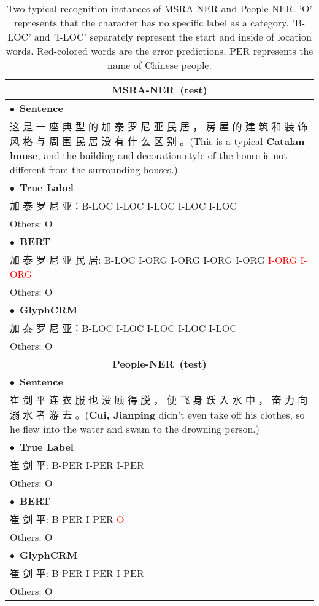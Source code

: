 \begin{CJK}{UTF8}{gbsn}
\begin{table}[t]
\renewcommand\arraystretch{1.15}
\small
\centering
\caption{Two typical recognition instances of MSRA-NER and People-NER. 'O' represents that the character has no specific label as a category. 'B-LOC' and 'I-LOC' separately represent the start and inside of location words. Red-colored words are the error predictions. PER represents the name of Chinese people.}
\label{tab:exp7}
\begin{tabular}{|p{7.5cm}|}
\hline
\multicolumn{1}{|c|}{\textbf{MSRA-NER~(test)}} \\
\hline
$\bullet$~\textbf{Sentence}\\
这 是 一 座 典 型 的 加 泰 罗 尼 亚 民 居 ， 房 屋 的 建 筑 和 装 饰 风 格 与 周 围 民 居 没 有 什 么 区 别 。(This is a typical \textbf{Catalan house}, and the building and decoration style of the house is not different from the surrounding houses.)\\
$\bullet$~\textbf{True Label}\\
加 泰 罗 尼 亚：B-LOC I-LOC I-LOC I-LOC I-LOC\\ 
Others: O\\
$\bullet$~\textbf{BERT}\\
加 泰 罗 尼 亚 民 居: B-LOC I-ORG I-ORG I-ORG I-ORG \textcolor{red}{I-ORG I-ORG} \\
Others: O\\
$\bullet$~\textbf{GlyphCRM}\\
加 泰 罗 尼 亚：B-LOC I-LOC I-LOC I-LOC I-LOC\\ 
Others: O\\
\hline
\multicolumn{1}{|c|}{\textbf{People-NER~(test)}} \\
\hline
$\bullet$~\textbf{Sentence} \\
崔 剑 平 连 衣 服 也 没 顾 得 脱 ， 便 飞 身 跃 入 水 中 ， 奋 力 向 溺 水 者 游 去 。(\textbf{Cui, Jianping} didn't even take off his clothes, so he flew into the water and swam to the drowning person.)\\
$\bullet$~\textbf{True Label} \\
崔 剑 平: B-PER I-PER I-PER\\
Others: O\\
$\bullet$~\textbf{BERT}\\
崔 剑 平: B-PER I-PER \textcolor{red}{O}\\
Others: O\\
$\bullet$~\textbf{GlyphCRM}\\
崔 剑 平: B-PER I-PER I-PER\\
Others: O\\
\hline
\end{tabular}
\end{table}
\end{CJK}
